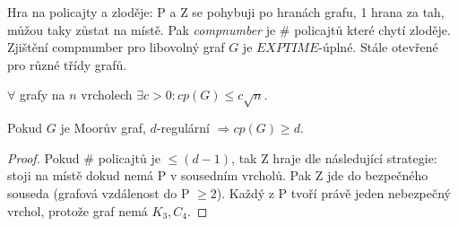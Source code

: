 \begin{example}
	Hra na policajty a zloděje: P a Z se pohybuji po hranách grafu, 1 hrana za tah, můžou taky zůstat na místě.
	Pak \emph{compnumber} je \# policajtů které chytí zloděje.
	Zjištění compnumber pro libovolný graf $G$ je $EXPTIME$-úplné.
	Stále otevřené pro různé třídy grafů.

	\begin{conj}[Meynil]
		$\forall$ grafy na $n$ vrcholech $\exists c > 0: cp(G) \leq c \sqrt{n}$.
	\end{conj}

	\begin{observation}
		Pokud $G$ je Moorův graf, $d$-regulární $\Rightarrow cp(G) \geq d$.
	\end{observation}
	\begin{proof}
		Pokud \# policajtů je $\leq (d - 1)$, tak Z hraje dle následující strategie: stoji na místě dokud nemá P v sousedním vrcholů.
		Pak Z jde do bezpečného souseda (grafová vzdálenost do P $\geq 2$).
		Každý z P tvoří právě jeden nebezpečný vrchol, protože graf nemá $K_3, C_4$.
	\end{proof}
\end{example}
